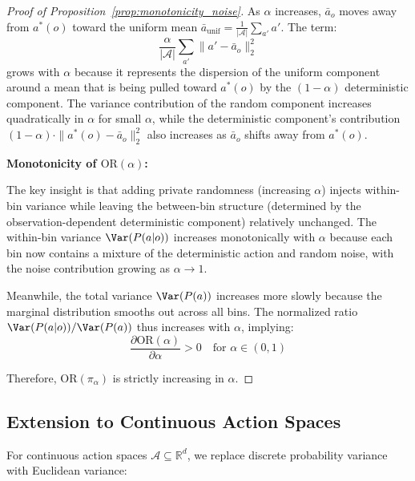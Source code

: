 \begin{proof}[Proof of Proposition~\ref{prop:monotonicity_noise}]
As $\alpha$ increases, $\bar{a}_o$ moves away from $a^*(o)$ toward the uniform mean $\bar{a}_{\text{unif}} = \frac{1}{|\mathcal{A}|}\sum_{a'} a'$. The term:
\begin{equation}
\frac{\alpha}{|\mathcal{A}|} \sum_{a'} \|a' - \bar{a}_o\|_2^2
\end{equation}
grows with $\alpha$ because it represents the dispersion of the uniform component around a mean that is being pulled toward $a^*(o)$ by the $(1-\alpha)$ deterministic component. The variance contribution of the random component increases quadratically in $\alpha$ for small $\alpha$, while the deterministic component's contribution $(1-\alpha) \cdot \|a^*(o) - \bar{a}_o\|_2^2$ also increases as $\bar{a}_o$ shifts away from $a^*(o)$.

\textbf{Monotonicity of $\mathrm{OR}(\alpha)$:}

The key insight is that adding private randomness (increasing $\alpha$) injects within-bin variance while leaving the between-bin structure (determined by the observation-dependent deterministic component) relatively unchanged. The within-bin variance $\Var(P(a|o))$ increases monotonically with $\alpha$ because each bin now contains a mixture of the deterministic action and random noise, with the noise contribution growing as $\alpha \to 1$.

Meanwhile, the total variance $\Var(P(a))$ increases more slowly because the marginal distribution smooths out across all bins. The normalized ratio $\Var(P(a|o)) / \Var(P(a))$ thus increases with $\alpha$, implying:
\begin{equation}
\frac{\partial \mathrm{OR}(\alpha)}{\partial \alpha} > 0 \quad \text{for } \alpha \in (0, 1)
\end{equation}

Therefore, $\mathrm{OR}(\pi_\alpha)$ is strictly increasing in $\alpha$.
\end{proof}

\subsection{Extension to Continuous Action Spaces}
\label{app:continuous_or}

For continuous action spaces $\mathcal{A} \subseteq \mathbb{R}^d$, we replace discrete probability variance with Euclidean variance:


